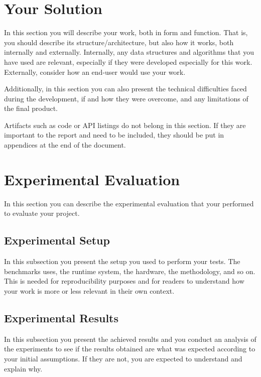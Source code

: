 \documentclass[sigconf,balance,nonacm,authordraft]{acmart}
\begin{document}
\section{Your Solution}
\label{sec:solution}
In this section you will describe your work, both in form and function. That is, you should describe its structure/architecture, but also how it works, both internally and externally. Internally, any data structures and algorithms that you have used are relevant, especially if they were developed especially for this work. Externally, consider how an end-user would use your work.

Additionally, in this section you can also present the technical difficulties faced during the development, if and how they were overcome, and any limitations of the final product.

Artifacts such as code or API listings do not belong in this section. If they are important to the report and need to be included, they should be put in appendices at the end of the document.

\section{Experimental Evaluation}
\label{sec:evaluation}
In this section you can describe the experimental evaluation that your performed to evaluate your project.

\subsection{Experimental Setup}
In this subsection you present the setup you used to perform your tests. The benchmarks uses, the runtime system, the hardware, the methodology, and so on. This is needed for reproducibility purposes and for readers to understand how your work is more or less relevant in their own context.

\subsection{Experimental Results}
In this subsection you present the achieved results and you conduct an analysis of the experiments to see if the results obtained are what was expected according to your initial assumptions. If they are not, you are expected to understand and explain why.

\end{document}
